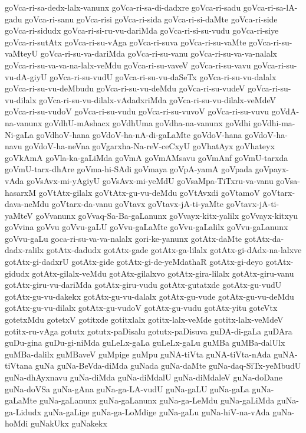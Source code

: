 {goVca-ri-sa-dedx-lalx-vanunx
goVca-ri-sa-di-dadxre
goVca-ri-sadu
goVca-ri-sa-lA-gadu
goVca-ri-sanu
goVca-risi
goVca-ri-sida
goVca-ri-si-daMte
goVca-ri-side
goVca-ri-sidudx
goVca-ri-si-ru-vu-dariMda
goVca-ri-si-su-vudu
goVca-ri-siye
goVca-ri-sutAtx
goVca-ri-su-vAga
goVca-ri-suva
goVca-ri-su-vaMte
goVca-ri-su-vaMteyU
goVca-ri-su-va-dariMda
goVca-ri-su-vanu
goVca-ri-su-va-va-nalalx
goVca-ri-su-va-va-na-lalx-veMdu
goVca-ri-su-vaveV
goVca-ri-su-vavu
goVca-ri-su-vu-dA-giyU
goVca-ri-su-vudU
goVca-ri-su-vu-daSeTx
goVca-ri-su-vu-dalalx
goVca-ri-su-vu-deMbudu
goVca-ri-su-vu-deMdu
goVca-ri-su-vudeV
goVca-ri-su-vu-dilalx
goVca-ri-su-vu-dilalx-vAdadxriMda
goVca-ri-su-vu-dilalx-veMdeV
goVca-ri-su-vudoV
goVca-ri-su-vudu
goVca-ri-su-vuvoV
goVca-ri-su-vuvu
goVdA-na-vanunx
goVdhU-mAshacx
goVdhUma
goVdha-na-vanunx
goVdhi
goVdhi-ma-Ni-gaLa
goVdhoV-hana
goVdoV-ha-nA-di-gaLaMte
goVdoV-hana
goVdoV-ha-navu
goVdoV-ha-neVna
goVgarxha-Na-reV-ceCxyU
goVhatAyx
goVhateyx
goVkAmA
goVla-ka-gaLiMda
goVmA
goVmAMsavu
goVmAnf
goVmU-tarxda
goVmU-tarx-dhAre
goVma-hi-SAdi
goVmaya
goVpA-yamA
goVpada
goVpayx-vAda
goVsAvx-mi-yAgiyU
goVsAvx-mi-yeMdU
goVsaMpa-TiTxru-va-vanu
goVsa-hasarxM
goVtAtx-gilalx
goVtAtx-gu-vu-deMdu
goVtAvxdi
goVtamoV
goVtarx-dava-neMdu
goVtarx-da-vanu
goVtavx
goVtavx-jA-ti-yaMte
goVtavx-jA-ti-yaMteV
goVvanunx
goVvaq-Sa-Ba-gaLanunx
goVvayx-kitx-yalilx
goVvayx-kitxyu
goVvina
goVvu
goVvu-gaLU
goVvu-gaLaMte
goVvu-gaLalilx
goVvu-gaLanunx
goVvu-gaLu
goca-ri-su-va-va-nalalx
gori-ke-yanunx
gotAtx-daMte
gotAtx-da-dadx-ralilx
gotAtx-dadudx
gotAtx-gade
gotAtx-ga-lilalx
gotAtx-gi-dAdx-na-lalxve
gotAtx-gi-dadxrU
gotAtx-gide
gotAtx-gi-de-yeMdathaR
gotAtx-gi-deyo
gotAtx-gidudx
gotAtx-gilalx-veMdu
gotAtx-gilalxvo
gotAtx-gira-lilalx
gotAtx-giru-vanu
gotAtx-giru-vu-dariMda
gotAtx-giru-vudu
gotAtx-gutatxde
gotAtx-gu-vudU
gotAtx-gu-vu-dakekx
gotAtx-gu-vu-dalalx
gotAtx-gu-vude
gotAtx-gu-vu-deMdu
gotAtx-gu-vu-dilalx
gotAtx-gu-vudoV
gotAtx-gu-vudu
gotAtx-yitu
goteVtx
gotetxMdu
gotetxV
gotitxde
gotitxlalx
gotitx-lalx-veMde
gotitx-lalx-veMdeV
gotitx-ru-vAga
gotutx
gotutx-paDisalu
gotutx-paDisuva
guDA-di-gaLa
guDAra
guDu-gina
guDu-gi-niMda
guLeLx-gaLa
guLeLx-gaLu
guMBa
guMBa-dalUlx
guMBa-dalilx
guMBaveV
guMpige
guMpu
guNA-tiVta
guNA-tiVta-nAda
guNA-tiVtana
guNa
guNa-BeVda-diMda
guNada
guNa-daMte
guNa-daq-SiTx-yeMbudU
guNa-dhAyxnavu
guNa-diMda
guNa-diMdalU
guNa-diMdaleV
guNa-doDane
guNa-doVSa
guNa-gAna
guNa-ga-LA-vudU
guNa-gaLU
guNa-gaLa
guNa-gaLaMte
guNa-gaLanunx
guNa-gaLanunx
guNa-ga-LeMdu
guNa-gaLiMda
guNa-ga-Lidudx
guNa-gaLige
guNa-ga-LoMdige
guNa-gaLu
guNa-hiV-na-vAda
guNa-hoMdi
guNakUkx
guNakekx
}
